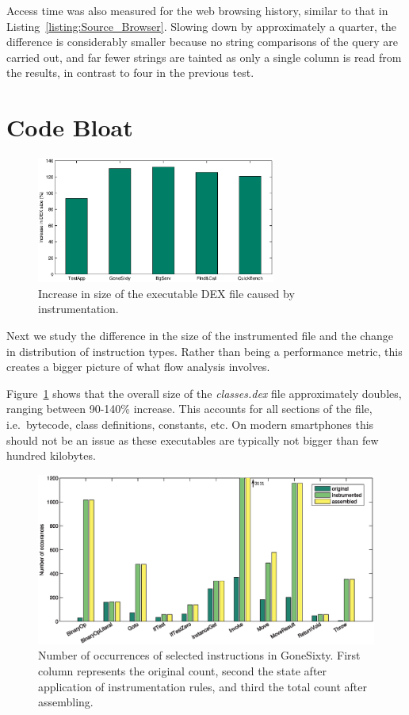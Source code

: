 \documentclass[12pt,twoside,notitlepage]{report}
\begin{document}
Access time was also measured for the web browsing history, similar to that in Listing~\ref{listing:Source_Browser}. Slowing down by approximately a quarter, the difference is considerably smaller because no string comparisons of the query are carried out, and far fewer strings are tainted as only a single column is read from the results, in contrast to four in the previous test.

\section{Code Bloat}

\begin{figure}
	\centerline{
		\includegraphics[width=0.7\textwidth]{figs/fig_eval_filesize.eps}
	}
	\caption{Increase in size of the executable DEX file caused by instrumentation.}
	\label{figure:Evalutaion_FileSize}
\end{figure}

Next we study the difference in the size of the instrumented file and the change in distribution of instruction types. Rather than being a performance metric, this creates a bigger picture of what flow analysis involves.

Figure~\ref{figure:Evalutaion_FileSize} shows that the overall size of the \emph{classes.dex} file approximately doubles, ranging between 90-140\% increase. This accounts for all sections of the file, i.e.\ bytecode, class definitions, constants, etc. On modern smartphones this should not be an issue as these executables are typically not bigger than few hundred kilobytes.

\begin{figure}
	\centerline{	
		\includegraphics[width=\textwidth]{figs/fig_eval_codebloat.eps}
	}
	\caption{Number of occurrences of selected instructions in GoneSixty. First column represents the original count, second the state after application of instrumentation rules, and third the total count after assembling.}
	\label{figure:Evalutaion_CodeBloat}
\end{figure}
\end{document}
